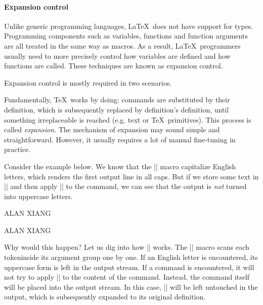 \documentclass{ltugboat}
\begin{document}
\paragraph{Expansion control} 


Unlike generic programming languages, \LaTeX\ does not have support for types.
Programming components such as variables, functions and function arguments are all treated in the same way as macros.
As a result, \LaTeX~programmers usually need to more precisely control how variables are defined and how functions are called. These techniques are known as expansion control.

Expansion control is mostly required in two  scenarios.

Fundamentally, \TeX\ works by doing: commands are substituted by their definition,
which is subsequently replaced by definition's definition, until 
something irreplaceable is reached (e.g. text or \TeX\ primitives). 
This process is called \emph{expansion}. The mechanism of expansion
may sound simple and straightforward. However, it usually requires
a lot of manual fine-tuning in practice.

Consider the example below. We know that the \inltex|\uppercase| macro
capitalize English letters, which renders the first output line in all 
caps. But if we store some text in \inltex|\myname| and then apply
\inltex|\uppercase| to the command, we can see that the output is
\emph{not} turned into uppercase letters.

\begin{latexsample*}[]
\par\uppercase{Alan Xiang}
\newcommand*{\myname}{Alan Xiang}
\par\uppercase{\myname}
\end{latexsample*}

Why would this happen? Let us dig into how \inltex|\uppercase| works. 
The \inltex|\uppercase| macro scans each token\footnotemark inside its argument 
group one by one. If an English letter is encountered, its uppercase 
form is left in the output stream. If a command is encountered, it 
will not try to apply \inltex|\uppercase| to the content of the command. 
Instead, the command itself will be placed into the output stream. 
In this case, \inltex|\myname| will be left untouched in the output, 
which is subsequently expanded to its original definition.
\end{document}
